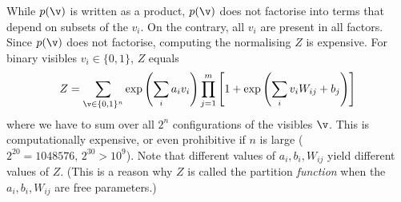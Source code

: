 \begin{exenumerate}
\begin{solution}
       While $p(\v)$ is written as a product, $p(\v)$ does not
       factorise into terms that depend on subsets of the
       $v_i$. On the contrary, all $v_i$ are present in all
       factors. Since $p(\v)$ does not factorise, computing the
       normalising $Z$ is expensive. For binary visibles
       $v_i \in \{0,1\}$, $Z$ equals
       \begin{equation}
         Z = \sum_{\v \in \{0,1\}^n} \exp\left( \sum_i a_i v_i \right) \prod_{j=1}^m \left[1+ \exp\left(\sum_i v_i W_{ij} + b_j \right)\right]
       \end{equation}
       where we have to sum over all $2^n$ configurations of the
       visibles $\v$. This is computationally expensive, or even
       prohibitive if $n$ is large ($2^{20} = 1048576,\, 2^{30}>
       10^9$). Note that different values of $a_i,b_i,W_{ij}$ yield
       different values of $Z$. (This is a reason why $Z$ is called
       the partition \emph{function} when the $a_i, b_i, W_{ij}$ are free parameters.)


\end{solution}
\end{exenumerate}
